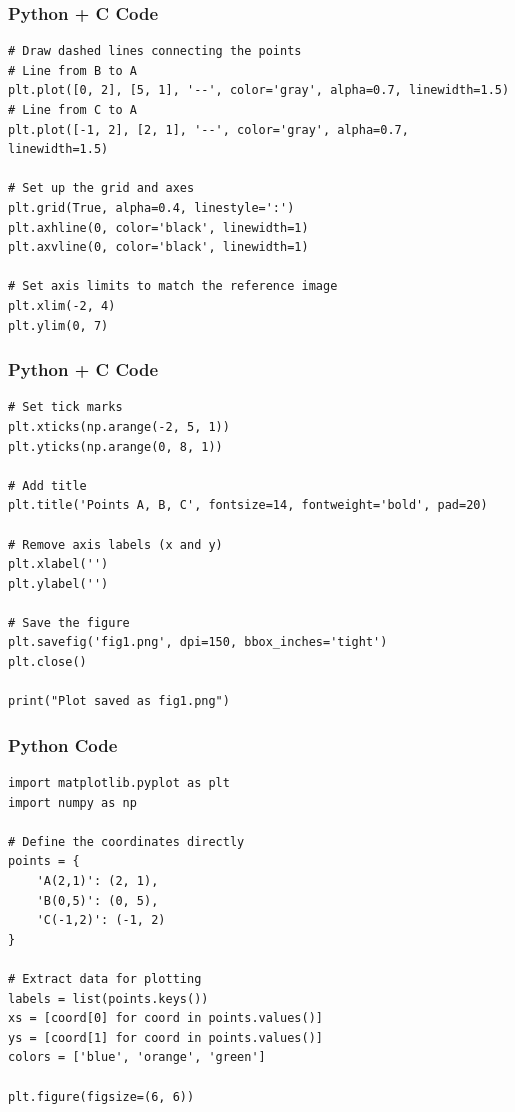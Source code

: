 \documentclass{beamer}
\begin{document}
\begin{frame}[fragile]
    \frametitle{Python + C Code}
    \begin{lstlisting}
# Draw dashed lines connecting the points
# Line from B to A
plt.plot([0, 2], [5, 1], '--', color='gray', alpha=0.7, linewidth=1.5)
# Line from C to A  
plt.plot([-1, 2], [2, 1], '--', color='gray', alpha=0.7, linewidth=1.5)

# Set up the grid and axes
plt.grid(True, alpha=0.4, linestyle=':')
plt.axhline(0, color='black', linewidth=1)
plt.axvline(0, color='black', linewidth=1)

# Set axis limits to match the reference image
plt.xlim(-2, 4)
plt.ylim(0, 7)

    \end{lstlisting}
\end{frame}

\begin{frame}[fragile]
    \frametitle{Python + C Code}
    \begin{lstlisting}
# Set tick marks
plt.xticks(np.arange(-2, 5, 1))
plt.yticks(np.arange(0, 8, 1))

# Add title
plt.title('Points A, B, C', fontsize=14, fontweight='bold', pad=20)

# Remove axis labels (x and y)
plt.xlabel('')
plt.ylabel('')

# Save the figure
plt.savefig('fig1.png', dpi=150, bbox_inches='tight')
plt.close()

print("Plot saved as fig1.png")
    \end{lstlisting}
\end{frame}


\begin{frame}[fragile]
    \frametitle{Python Code}
    \begin{lstlisting}
import matplotlib.pyplot as plt
import numpy as np

# Define the coordinates directly
points = {
    'A(2,1)': (2, 1),
    'B(0,5)': (0, 5),
    'C(-1,2)': (-1, 2)
}

# Extract data for plotting
labels = list(points.keys())
xs = [coord[0] for coord in points.values()]
ys = [coord[1] for coord in points.values()]
colors = ['blue', 'orange', 'green']

plt.figure(figsize=(6, 6))
    \end{lstlisting}
\end{frame}
\end{document}
